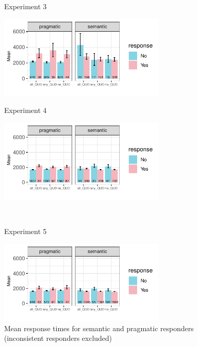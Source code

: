\documentclass[12pt]{article}
\begin{document}
\begin{figure}[!ht] 
    \begin{minipage}{.5\textwidth}
        \caption*{Experiment 3}
        \includegraphics[height=4cm]{img/exp3_responder.pdf}
    \end{minipage}%
    \begin{minipage}{.5\textwidth}
        \caption*{Experiment 4}
        \includegraphics[height=4cm]{img/exp4_responder_scale.pdf}
    \end{minipage}%
    \\
    \begin{minipage}{.5\textwidth}
        \caption*{Experiment 5}
        \includegraphics[height=4cm]{img/exp5_responder.pdf}
    \end{minipage}%
    \caption{Mean response times for semantic and pragmatic responders (inconsistent responders excluded)}
\end{figure}
\end{document}
